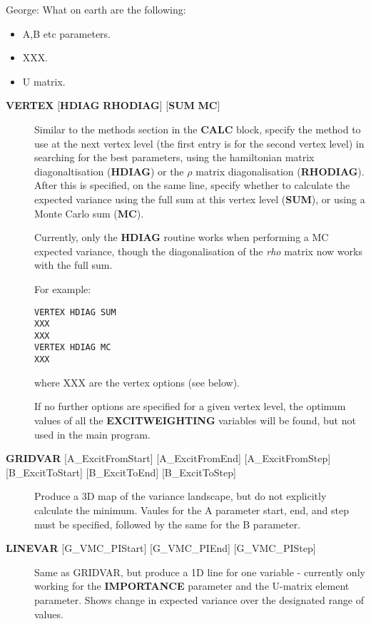 \documentclass[openany,a4paper,10pt]{manual}
\begin{document}
\begin{notice}[note]
George:
What on earth are the following:
\begin{itemize}
\item {} 
A,B etc parameters.

\item {} 
XXX.

\item {} 
U matrix.

\end{itemize}
\end{notice}
\begin{description}
\item[\textbf{VERTEX} {[}\textbf{HDIAG} \textbf{RHODIAG}{]} {[}\textbf{SUM} \textbf{MC}{]}]
Similar to the methods section in the \textbf{CALC} block, specify the
method to use at the next vertex level (the first entry is for the
second vertex level) in searching for the best parameters, using the
hamiltonian matrix diagonaltisation (\textbf{HDIAG}) or the $\rho$
matrix diagonalisation (\textbf{RHODIAG}). After this is specified, on
the same line, specify whether to calculate the expected variance
using the full sum at this vertex level (\textbf{SUM}), or using a Monte
Carlo sum (\textbf{MC}).

Currently, only the \textbf{HDIAG} routine works when performing a MC
expected variance, though the diagonalisation of the \emph{rho} matrix
now works with the full sum.

For example:

\begin{Verbatim}[commandchars=@\[\]]
VERTEX HDIAG SUM
XXX
XXX
VERTEX HDIAG MC
XXX
\end{Verbatim}

where XXX are the vertex options (see below).

If no further options are specified for a given vertex level, the
optimum values of all the \textbf{EXCITWEIGHTING} variables will be found,
but not used in the main program.

\item[\textbf{GRIDVAR} {[}A\_ExcitFromStart{]} {[}A\_ExcitFromEnd{]} {[}A\_ExcitFromStep{]} {[}B\_ExcitToStart{]} {[}B\_ExcitToEnd{]} {[}B\_ExcitToStep{]}]
Produce a 3D map of the variance landscape, but do not explicitly
calculate the minimum. Vaules for the A parameter start, end, and
step must be specified, followed by the same for the B parameter.

\item[\textbf{LINEVAR} {[}G\_VMC\_PIStart{]} {[}G\_VMC\_PIEnd{]} {[}G\_VMC\_PIStep{]}]
Same as GRIDVAR, but produce a 1D line for one variable - currently
only working for the \textbf{IMPORTANCE} parameter and the U-matrix element
parameter. Shows change in expected variance over the designated range
of values.


\end{description}
\end{document}
